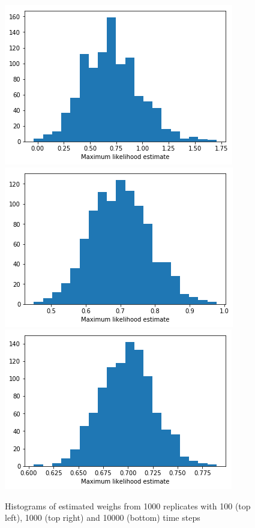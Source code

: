 \begin{figure}[hbt!]
    \centering
    \includegraphics[scale = 0.40]{fig/ML_100.png}
    \includegraphics[scale = 0.40]{fig/ML_1000.png}
    \includegraphics[scale = 0.40]{fig/ML_10000.png}
    \caption{Histograms of estimated weighs from 1000 replicates with 100 (top left), 1000 (top right) and 10000 (bottom) time steps}
    \label{fig:ML_hist}
\end{figure}


